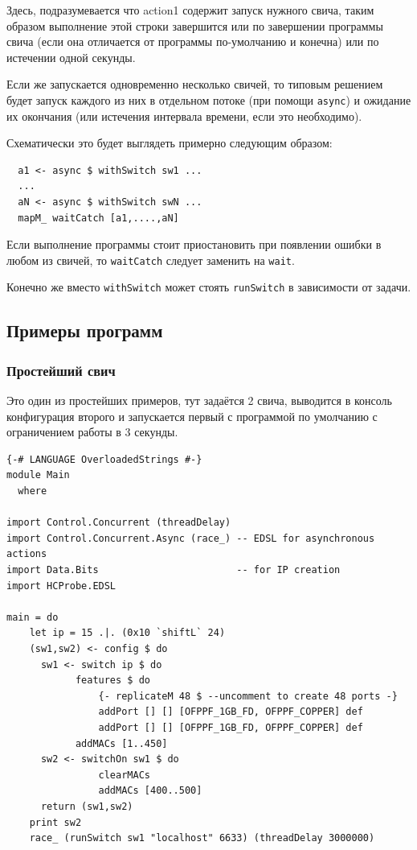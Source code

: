 \documentclass[9pt,a4paper]{article}
\begin{document}
Здесь, подразумевается что action1 содержит запуск нужного свича, таким образом
выполнение этой строки завершится или по завершении программы свича (если она
отличается от программы по-умолчанию и конечна) или по истечении одной секунды.

Если же запускается одновременно несколько свичей, то типовым решением будет
запуск каждого из них в отдельном потоке (при помощи \lstinline!async!) и ожидание
их окончания (или истечения интервала времени, если это необходимо).

Схематически это будет выглядеть примерно следующим образом:

\begin{lstlisting}
  a1 <- async $ withSwitch sw1 ...
  ...
  aN <- async $ withSwitch swN ...
  mapM_ waitCatch [a1,....,aN]
\end{lstlisting}

Если выполнение программы стоит приостановить при появлении ошибки в любом из
свичей, то \lstinline!waitCatch! следует заменить на \lstinline!wait!.

Конечно же вместо \lstinline!withSwitch! может стоять \lstinline!runSwitch!
в зависимости от задачи.

\subsection{Примеры программ}

\subsubsection{Простейший свич}

Это один из простейших примеров, тут задаётся 2 свича,
выводится в консоль конфигурация второго и запускается
первый с программой по умолчанию с ограничением работы
в 3 секунды.

\begin{lstlisting}
{-# LANGUAGE OverloadedStrings #-}
module Main
  where

import Control.Concurrent (threadDelay)
import Control.Concurrent.Async (race_) -- EDSL for asynchronous actions
import Data.Bits                        -- for IP creation
import HCProbe.EDSL

main = do 
    let ip = 15 .|. (0x10 `shiftL` 24)
    (sw1,sw2) <- config $ do
      sw1 <- switch ip $ do
            features $ do
                {- replicateM 48 $ --uncomment to create 48 ports -}
                addPort [] [] [OFPPF_1GB_FD, OFPPF_COPPER] def
                addPort [] [] [OFPPF_1GB_FD, OFPPF_COPPER] def
            addMACs [1..450]
      sw2 <- switchOn sw1 $ do
                clearMACs 
                addMACs [400..500]
      return (sw1,sw2)
    print sw2
    race_ (runSwitch sw1 "localhost" 6633) (threadDelay 3000000)
\end{lstlisting}
\end{document}
